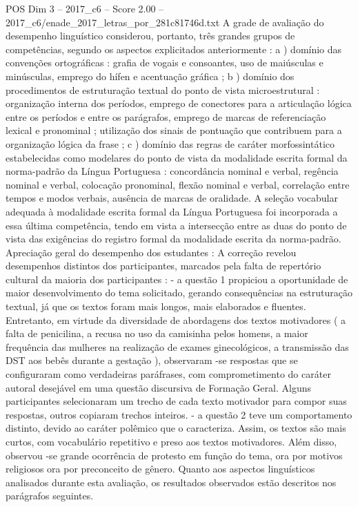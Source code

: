 \begin{textsample}{POS Dim 3 – 2017\_c6 – Score 2.00 – 2017\_c6/enade\_2017\_letras\_por\_281c81746d.txt}
A grade de avaliação do desempenho linguístico considerou, portanto, três grandes grupos de competências, segundo os aspectos explicitados anteriormente : a ) domínio das convenções ortográficas : grafia de vogais e consoantes, uso de maiúsculas e minúsculas, emprego do hífen e acentuação gráfica ; b ) domínio dos procedimentos de estruturação textual do ponto de vista microestrutural : organização interna dos períodos, emprego de conectores para a articulação lógica entre os períodos e entre os parágrafos, emprego de marcas de referenciação lexical e pronominal ; utilização dos sinais de pontuação que contribuem para a organização lógica da frase ; c ) domínio das regras de caráter morfossintático estabelecidas como modelares do ponto de vista da modalidade escrita formal da norma-padrão da Língua Portuguesa : concordância nominal e verbal, regência nominal e verbal, colocação pronominal, flexão nominal e verbal, correlação entre tempos e modos verbais, ausência de marcas de oralidade.
A seleção vocabular adequada à modalidade escrita formal da Língua Portuguesa foi incorporada a essa última competência, tendo em vista a intersecção entre as duas do ponto de vista das exigências do registro formal da modalidade escrita da norma-padrão.
Apreciação geral do desempenho dos estudantes : A correção revelou desempenhos distintos dos participantes, marcados pela falta de repertório cultural da maioria dos participantes : - a questão 1 propiciou a oportunidade de maior desenvolvimento do tema solicitado, gerando consequências na estruturação textual, já que os textos foram mais longos, mais elaborados e fluentes.
Entretanto, em virtude da diversidade de abordagens dos textos motivadores ( a falta de penicilina, a recusa no uso da camisinha pelos homens, a maior frequência das mulheres na realização de exames ginecológicos, a transmissão das DST aos bebês durante a gestação ), observaram -se respostas que se configuraram como verdadeiras paráfrases, com comprometimento do caráter autoral desejável em uma questão discursiva de Formação Geral.
Alguns participantes selecionaram um trecho de cada texto motivador para compor suas respostas, outros copiaram trechos inteiros. - a questão 2 teve um comportamento distinto, devido ao caráter polêmico que o caracteriza.
Assim, os textos são mais curtos, com vocabulário repetitivo e preso aos textos motivadores.
Além disso, observou -se grande ocorrência de protesto em função do tema, ora por motivos religiosos ora por preconceito de gênero.
Quanto aos aspectos linguísticos analisados durante esta avaliação, os resultados observados estão descritos nos parágrafos seguintes.

\end{textsample}
